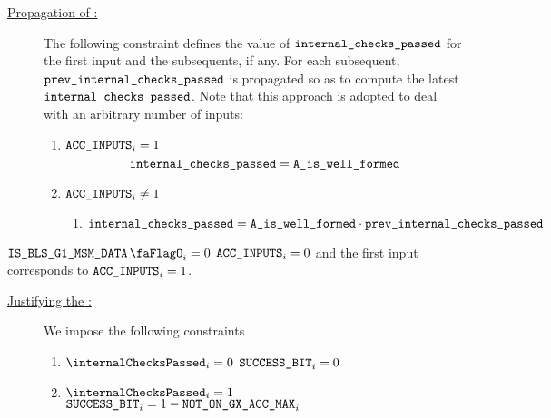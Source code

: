 \begin{description}
    \item[\underline{Propagation of \locInternalChecksPassed:}]
          The following constraint defines the value of $\texttt{internal\_checks\_passed}$ for the first input and the subsequents, if any.
          For each subsequent, $\texttt{prev\_}\texttt{internal\_checks\_passed}$ is propagated so as to compute the latest $\texttt{internal\_checks\_passed}$.
          Note that this approach is adopted to deal with an arbitrary number of inputs:
          \begin{enumerate}
              \item \If $\texttt{ACC\_INPUTS}_{i} = 1$ \Then
                    \[
                        \texttt{internal\_checks\_passed} = \texttt{A\_is\_well\_formed} 
                    \]
              \item \If $\texttt{ACC\_INPUTS}_{i} \neq 1$ \Then
                    \begin{enumerate}
                        \item $\texttt{internal\_checks\_passed} = \texttt{A\_is\_well\_formed} \cdot \texttt{prev\_}\texttt{internal\_checks\_passed}$
                    \end{enumerate}
          \end{enumerate}
\end{description}
\saNote{} \If $\isBlsGOneMsmData_{i} = 0$ \Then $\texttt{ACC\_INPUTS}_{i} = 0$ and the first input corresponds to $\texttt{ACC\_INPUTS}_{i} = 1$.
\begin{description}
    \item[\underline{Justifying the \blsSuccessBit{}:}]
          We impose the following constraints
          \begin{enumerate}
              \item \If $\internalChecksPassed _{i}= 0$ \Then $\texttt{SUCCESS\_BIT} _{i} = 0$
              \item \If $\internalChecksPassed _{i}= 1$  \Then $\texttt{SUCCESS\_BIT}_{i} = 1 - \texttt{NOT\_ON\_GX\_ACC\_MAX} _{i}$
          \end{enumerate}
\end{description}